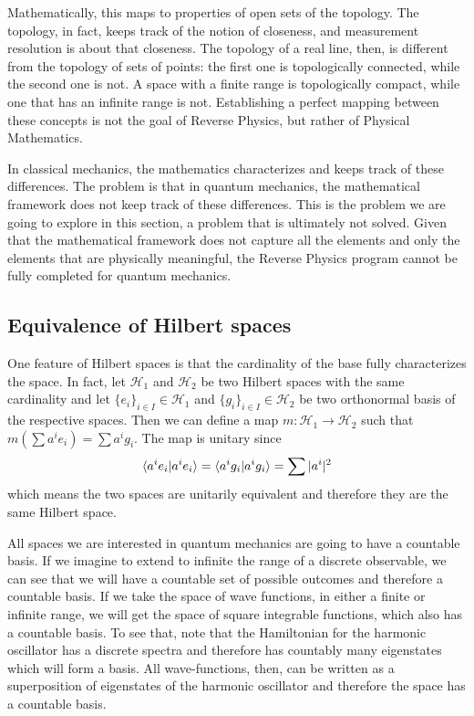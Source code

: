Mathematically, this maps to properties of open sets of the topology. The topology, in fact, keeps track of the notion of closeness, and measurement resolution is about that closeness. The topology of a real line, then, is different from the topology of sets of points: the first one is topologically connected, while the second one is not. A space with a finite range is topologically compact, while one that has an infinite range is not. Establishing a perfect mapping between these concepts is not the goal of Reverse Physics, but rather of Physical Mathematics.

In classical mechanics, the mathematics characterizes and keeps track of these differences. The problem is that in quantum mechanics, the mathematical framework does not keep track of these differences. This is the problem we are going to explore in this section, a problem that is ultimately not solved. Given that the mathematical framework does not capture all the elements and only the elements that are physically meaningful, the Reverse Physics program cannot be fully completed for quantum mechanics.

\subsection{Equivalence of Hilbert spaces}

One feature of Hilbert spaces is that the cardinality of the base fully characterizes the space. In fact, let $\mathcal{H}_1$ and $\mathcal{H}_2$ be two Hilbert spaces with the same cardinality and let $\{e_i\}_{i \in I} \in \mathcal{H}_1$ and $\{g_i\}_{i \in I} \in \mathcal{H}_2$ be two orthonormal basis of the respective spaces. Then we can define a map $m : \mathcal{H}_1 \to \mathcal{H}_2$ such that $m(\sum a^i e_i) = \sum a^i g_i$. The map is unitary since
\begin{equation}
	\langle a^i e_i | a^i e_i\rangle = \langle a^i g_i | a^i g_i\rangle = \sum | a^i | ^2
\end{equation}
which means the two spaces are unitarily equivalent and therefore they are the same Hilbert space.

All spaces we are interested in quantum mechanics are going to have a countable basis. If we imagine to extend to infinite the range of a discrete observable, we can see that we will have a countable set of possible outcomes and therefore a countable basis. If we take the space of wave functions, in either a finite or infinite range, we will get the space of square integrable functions, which also has a countable basis. To see that, note that the Hamiltonian for the harmonic oscillator has a discrete spectra and therefore has countably many eigenstates which will form a basis. All wave-functions, then, can be written as a superposition of eigenstates of the harmonic oscillator and therefore the space has a countable basis.

